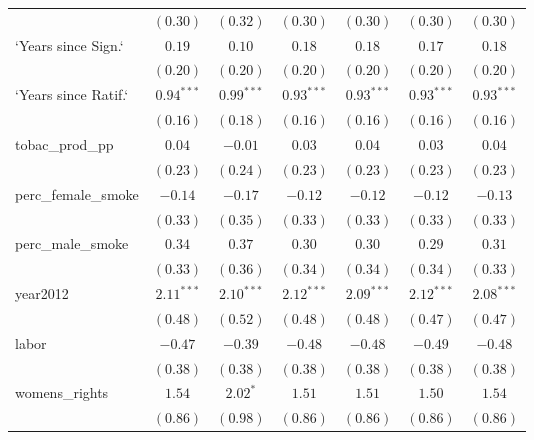 \begin{table}[!h]
\begin{center}
\begin{tabular}{l c c c c c c }
                        & $(0.30)$     & $(0.32)$     & $(0.30)$     & $(0.30)$     & $(0.30)$     & $(0.30)$     \\
`Years since Sign.`     & $0.19$       & $0.10$       & $0.18$       & $0.18$       & $0.17$       & $0.18$       \\
                        & $(0.20)$     & $(0.20)$     & $(0.20)$     & $(0.20)$     & $(0.20)$     & $(0.20)$     \\
`Years since Ratif.`    & $0.94^{***}$ & $0.99^{***}$ & $0.93^{***}$ & $0.93^{***}$ & $0.93^{***}$ & $0.93^{***}$ \\
                        & $(0.16)$     & $(0.18)$     & $(0.16)$     & $(0.16)$     & $(0.16)$     & $(0.16)$     \\
tobac\_prod\_pp         & $0.04$       & $-0.01$      & $0.03$       & $0.04$       & $0.03$       & $0.04$       \\
                        & $(0.23)$     & $(0.24)$     & $(0.23)$     & $(0.23)$     & $(0.23)$     & $(0.23)$     \\
perc\_female\_smoke     & $-0.14$      & $-0.17$      & $-0.12$      & $-0.12$      & $-0.12$      & $-0.13$      \\
                        & $(0.33)$     & $(0.35)$     & $(0.33)$     & $(0.33)$     & $(0.33)$     & $(0.33)$     \\
perc\_male\_smoke       & $0.34$       & $0.37$       & $0.30$       & $0.30$       & $0.29$       & $0.31$       \\
                        & $(0.33)$     & $(0.36)$     & $(0.34)$     & $(0.34)$     & $(0.34)$     & $(0.33)$     \\
year2012                & $2.11^{***}$ & $2.10^{***}$ & $2.12^{***}$ & $2.09^{***}$ & $2.12^{***}$ & $2.08^{***}$ \\
                        & $(0.48)$     & $(0.52)$     & $(0.48)$     & $(0.48)$     & $(0.47)$     & $(0.47)$     \\
labor                   & $-0.47$      & $-0.39$      & $-0.48$      & $-0.48$      & $-0.49$      & $-0.48$      \\
                        & $(0.38)$     & $(0.38)$     & $(0.38)$     & $(0.38)$     & $(0.38)$     & $(0.38)$     \\
womens\_rights          & $1.54$       & $2.02^{*}$   & $1.51$       & $1.51$       & $1.50$       & $1.54$       \\
                        & $(0.86)$     & $(0.98)$     & $(0.86)$     & $(0.86)$     & $(0.86)$     & $(0.86)$     \\

\end{tabular}
\end{center}
\end{table}
